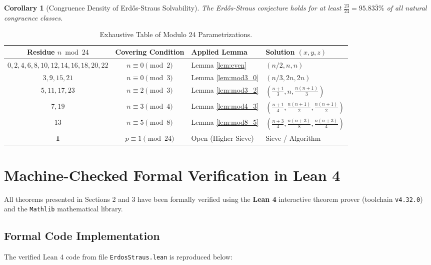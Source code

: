 \documentclass[11pt,a4paper]{article}
\newtheorem{corollary}[theorem]{Corollary}
\theoremstyle{definition}
\begin{document}
\begin{corollary}[Congruence Density of Erd\H{o}s-Straus Solvability]
The Erd\H{o}s-Straus conjecture holds for at least $\frac{23}{24} = 95.83\overline{3}\%$ of all natural congruence classes.
\end{corollary}

\begin{table}[h]
\centering
\small
\begin{tabular}{@{}ccll@{}}
\toprule
\textbf{Residue $n \bmod 24$} & \textbf{Covering Condition} & \textbf{Applied Lemma} & \textbf{Solution $(x, y, z)$} \\
\midrule
$0, 2, 4, 6, 8, 10, 12, 14, 16, 18, 20, 22$ & $n \equiv 0 \pmod 2$ & Lemma \ref{lem:even} & $(n/2, n, n)$ \\
$3, 9, 15, 21$ & $n \equiv 0 \pmod 3$ & Lemma \ref{lem:mod3_0} & $(n/3, 2n, 2n)$ \\
$5, 11, 17, 23$ & $n \equiv 2 \pmod 3$ & Lemma \ref{lem:mod3_2} & $(\frac{n+1}{3}, n, \frac{n(n+1)}{3})$ \\
$7, 19$ & $n \equiv 3 \pmod 4$ & Lemma \ref{lem:mod4_3} & $(\frac{n+1}{4}, \frac{n(n+1)}{2}, \frac{n(n+1)}{2})$ \\
$13$ & $n \equiv 5 \pmod 8$ & Lemma \ref{lem:mod8_5} & $(\frac{n+3}{4}, \frac{n(n+3)}{8}, \frac{n(n+3)}{4})$ \\
\midrule
$\mathbf{1}$ & $p \equiv 1 \pmod{24}$ & Open (Higher Sieve) & Sieve / Algorithm \\
\bottomrule
\end{tabular}
\caption{Exhaustive Table of Modulo 24 Parametrizations.}
\label{tab:mod24}
\end{table}

\section{Machine-Checked Formal Verification in Lean 4}

All theorems presented in Sections 2 and 3 have been formally verified using the \textbf{Lean 4} interactive theorem prover (toolchain \texttt{v4.32.0}) and the \texttt{Mathlib} mathematical library.

\subsection{Formal Code Implementation}
The verified Lean 4 code from file \texttt{ErdosStraus.lean} is reproduced below:
\end{document}

